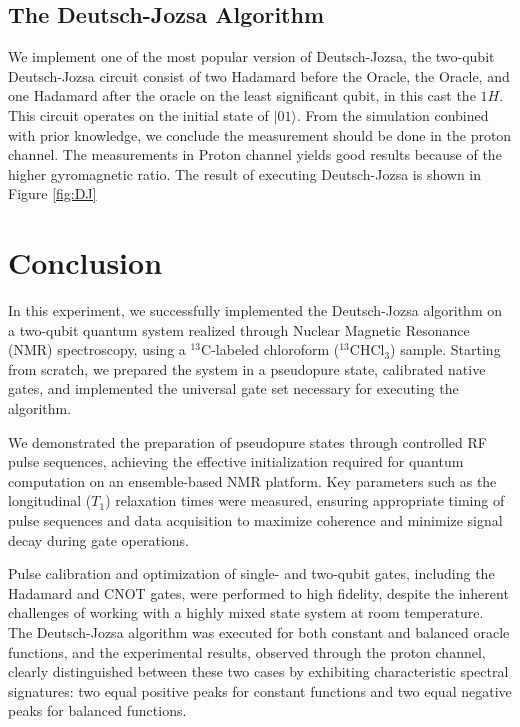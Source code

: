 \documentclass[%
 reprint,
 amsmath,amssymb,
 aps,
]{revtex4-2}
\begin{document}
\subsection{The Deutsch-Jozsa Algorithm}

We implement one of the most popular version of Deutsch-Jozsa\cite{enwiki:1280319525}, the two-qubit Deutsch-Jozsa circuit consist of two Hadamard before the Oracle, the Oracle, and one Hadamard after the oracle on the least significant qubit, in this cast the $1H$. This circuit operates on the initial state of $|01\rangle$. From the simulation conbined with prior knowledge\cite{Deutsch1992}, we conclude the measurement should be done in the proton channel. The measurements in Proton channel yields good results because of the higher gyromagnetic ratio. The result of executing Deutsch-Jozsa is shown in Figure \ref{fig:DJ}


\section{Conclusion}

In this experiment, we successfully implemented the Deutsch-Jozsa algorithm on a two-qubit quantum system realized through Nuclear Magnetic Resonance (NMR) spectroscopy, using a \(^{13}\mathrm{C}\)-labeled chloroform (\(^{13}\mathrm{CHCl}_3\)) sample. Starting from scratch, we prepared the system in a pseudopure state, calibrated native gates, and implemented the universal gate set necessary for executing the algorithm.

We demonstrated the preparation of pseudopure states through controlled RF pulse sequences, achieving the effective initialization required for quantum computation on an ensemble-based NMR platform. Key parameters such as the longitudinal (\(T_1\)) relaxation times were measured, ensuring appropriate timing of pulse sequences and data acquisition to maximize coherence and minimize signal decay during gate operations.

Pulse calibration and optimization of single- and two-qubit gates, including the Hadamard and CNOT gates, were performed to high fidelity, despite the inherent challenges of working with a highly mixed state system at room temperature. The Deutsch-Jozsa algorithm was executed for both constant and balanced oracle functions, and the experimental results, observed through the proton channel, clearly distinguished between these two cases by exhibiting characteristic spectral signatures: two equal positive peaks for constant functions and two equal negative peaks for balanced functions.
\end{document}
